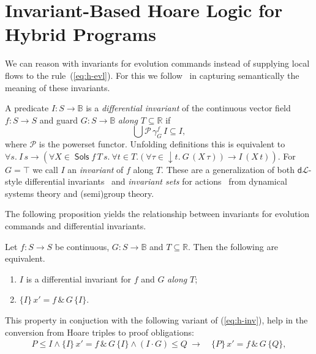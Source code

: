 \documentclass[envcountsames]{llncs}
\newcommand{\dL}{\mathsf{d}\mathcal{L}}
\newcommand{\reals}{\mathbb{R}}
\newcommand{\bools}{\mathbb{B}}
\newcommand{\Sols}{\mathop{\mathsf{Sols}}}
\newcommand\notein[3]{\todo[inline,linecolor=orange!80!black,backgroundcolor=#2!20]{#1: #3}%
}
\newcommand{\gin}[1]{\notein{{\bf GS}}{gcolor}{#1}}
\begin{document}
\gin{add example}



\section{Invariant-Based Hoare Logic for Hybrid Programs}\label{sec:hoare-inv}

We can reason with invariants for evolution commands instead of supplying local flows to the rule~(\ref{eq:h-evl}). For this we follow~\cite{MuniveS19} in capturing semantically the meaning of these invariants.

A predicate $I:S\to\bools$ is a \emph{differential invariant} of the continuous vector field $f:S\to S$ and guard $G:S\to\bools$ \emph{along} $T\subseteq \reals$ if
\begin{equation*}
\bigcup \mathcal{P}\, \gamma^f_G\, I\subseteq  I,
\end{equation*}
where $\mathcal{P}$ is the powerset functor. Unfolding definitions this is equivalent to $\forall s.\ I\, s \to (\forall X\in\Sols f\, T\, s.\ \forall t\in T. (\forall \tau\in {\downarrow}t.\ G\, (X\, \tau)) \to I\, (X\, t))$.
For $G=\top$ we call $I$ an \emph{invariant} of $f$ along $T$. These are a generalization of both $\dL$-style differential invariants~\cite{Platzer12} and \emph{invariant sets} for actions~\cite{Teschl12} from dynamical systems theory and (semi)group theory.

The following proposition yields the relationship between invariants for evolution commands and differential invariants.
\begin{proposition}\label{P:inv-prop}
  Let $f:S\to S$ be continuous, $G:S\to\bools$ and
  $T\subseteq \reals$. Then the following are equivalent.
\begin{enumerate}
\item $I$ is a differential invariant for $f$ and $G$ \emph{along} $T$;
\item $\{I\}\, x' = f\, \&\, G\, \{I\}$.
\end{enumerate}
\end{proposition}

This property in conjuction with the following variant of (\ref{eq:h-inv}), help in the conversion from Hoare triples to proof obligations:
\begin{align}
  P\le I \land \{I\}\, x' = f\, \&\, G\, \{I\}\land (I\cdot G)\le Q\ \rightarrow\
  &\{P\}\, x' = f\, \&\, G\, \{Q\},\label{eq:h-invg}\tag{h-invg}
\end{align}
\end{document}

